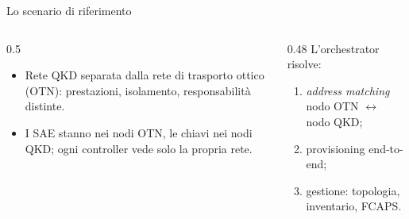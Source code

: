 \documentclass[10pt]{beamer}
\begin{document}
\begin{frame}{Lo scenario di riferimento}
  \vspace{-1ex}
  \vspace{-1.5ex}
  \small
  \begin{columns}[T]
    \begin{column}{0.5\textwidth}
      \begin{itemize}
        \item Rete QKD separata dalla rete di trasporto ottico (OTN):
              prestazioni, isolamento, responsabilità distinte.
        \item I \alert{SAE} stanno nei nodi OTN, le \alert{chiavi} nei
              nodi QKD; ogni controller vede solo la propria rete.
      \end{itemize}
    \end{column}
    \begin{column}{0.48\textwidth}
      L'orchestrator risolve:
      \begin{enumerate}
        \item \emph{address matching} nodo OTN $\leftrightarrow$ nodo QKD;
        \item provisioning end-to-end;
        \item gestione: topologia, inventario, FCAPS.
      \end{enumerate}
    \end{column}
  \end{columns}
\end{frame}
\end{document}
